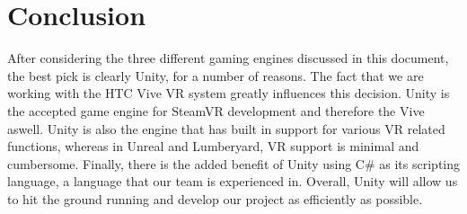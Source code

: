 \documentclass[10pt,journal,compsoc,onecolumn, draftclsnofoot]{IEEEtran}
\begin{document}
\section{Conclusion}
After considering the three different gaming engines discussed in this document, the best pick is clearly Unity, for a number of reasons.
The fact that we are working with the HTC Vive VR system greatly influences this decision.
Unity is the accepted game engine for SteamVR development and therefore the Vive aswell.
Unity is also the engine that has built in support for various VR related functions, whereas in Unreal and Lumberyard, VR support is minimal and cumbersome.
Finally, there is the added benefit of Unity using C\# as its scripting language, a language that our team is experienced in.
Overall, Unity will allow us to hit the ground running and develop our project as efficiently as possible.


\end{document}
